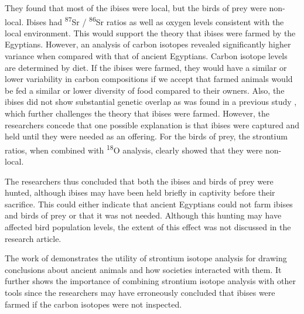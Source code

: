 \documentclass[a4paper, 12pt]{article}
\begin{document}
They found that most of the ibises were local, but the birds of prey were non-local.
Ibises had \textsuperscript{87}Sr / \textsuperscript{86}Sr ratios
as well as oxygen levels consistent with the local environment. This would support the theory that
ibises were farmed by the Egyptians. However, an analysis of carbon isotopes revealed
significantly higher variance when compared with that of ancient Egyptians. Carbon isotope
levels are determined by diet. If the ibises were farmed, they would have a similar or lower variability in carbon compositions
if we accept that farmed animals would be fed a similar or lower diversity of food compared to
their owners. Also, the ibises did not show substantial genetic overlap as was found in a previous study \citep{wasef2019}, which
further challenges the theory that ibises were farmed. However, the researchers concede
that one possible explanation is that ibises were captured and held until they were
needed as an offering.
For the birds of prey, the strontium ratios, when combined with \textsuperscript{18}O analysis, clearly
showed that they were non-local.

The researchers thus concluded that both the ibises and birds of prey were hunted, although
ibises may have been held briefly in captivity before their sacrifice. This could
either indicate that ancient Egyptians could not farm ibises and birds of prey or that
it was not needed. Although this hunting may have affected
bird population levels, the extent of this effect was not discussed
in the research article.

The work of \cite{linglin2020} demonstrates the utility of strontium isotope analysis
for drawing conclusions about ancient animals and how societies interacted with them.
It further shows the importance of combining strontium isotope analysis with other
tools since the researchers may have erroneously concluded that ibises were farmed
if the carbon isotopes were not inspected.
\end{document}
